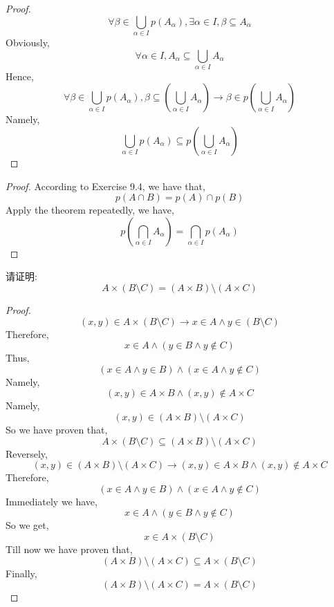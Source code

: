 \documentclass[a4paper, justified]{tufte-handout}
\begin{document}
\begin{problem}[UD Problem 9.9]
\end{problem}

\begin{proof}
  $$ \forall \beta \in \bigcup_{\alpha \in I} p(A_{\alpha}), \exists \alpha \in I, \beta \subseteq  A_{\alpha} $$
  Obviously,
  $$ \forall \alpha \in I, A_{\alpha} \subseteq \bigcup_{\alpha \in I} A_{\alpha} $$
  Hence,
  $$ \forall \beta \in \bigcup_{\alpha \in I} p(A_{\alpha}), \beta \subseteq (\bigcup_{\alpha \in I} A_{\alpha} ) \rightarrow \beta \in p(\bigcup_{\alpha \in I} A_{\alpha} ) $$
  Namely,
  $$ \bigcup_{\alpha \in I} p(A_{\alpha}) \subseteq p(\bigcup_{\alpha \in I} A_{\alpha} ) $$
\end{proof}

\begin{problem}[UD Problem 9.10]
\end{problem}

\begin{proof}
  According to Exercise 9.4, we have that,
  $$ p(A \cap B) = p(A) \cap p(B) $$
  Apply the theorem repeatedly, we have,
  $$ p(\bigcap \limits_{\alpha \in I} A_{\alpha}) = \bigcap \limits_{\alpha \in I}p(A_{\alpha}) $$
\end{proof}

\begin{problem}
  请证明: 
  \[
    A \times (B \setminus C) = (A \times B) \setminus (A \times C)
  \]
\end{problem}

\begin{proof}
  $$ (x,y) \in A \times (B \setminus C) \rightarrow x \in A \wedge y\in (B\setminus C) $$
  Therefore,
  $$ x \in A \wedge (y \in B \wedge y \notin C) $$ 
  Thus,
  $$ (x \in A \wedge y \in B) \wedge (x\in A \wedge y \notin C) $$
  Namely,
  $$ (x,y) \in A \times B \wedge (x,y) \notin A \times C $$
  Namely,
  $$ (x,y) \in (A \times B) \setminus (A \times C) $$
  So we have proven that,
  $$ A \times (B \setminus C) \subseteq (A \times B) \setminus (A \times C) $$
  Reversely,
  $$ (x,y) \in (A \times B) \setminus (A \times C) \rightarrow (x,y) \in A \times B \wedge (x,y) \notin A \times C$$
  Therefore,
  $$(x \in A \wedge y \in B) \wedge (x\in A \wedge y \notin C) $$
  Immediately we have,
  $$ x \in A \wedge (y \in B \wedge y \notin C) $$
  So we get,
  $$ x \in A \times (B \setminus C) $$
  Till now we have proven that,
  $$  (A \times B) \setminus (A \times C)  \subseteq A \times (B \setminus C) $$
  Finally,
  $$ (A \times B) \setminus (A \times C) = A \times (B \setminus C) $$
\end{proof}
\end{document}
